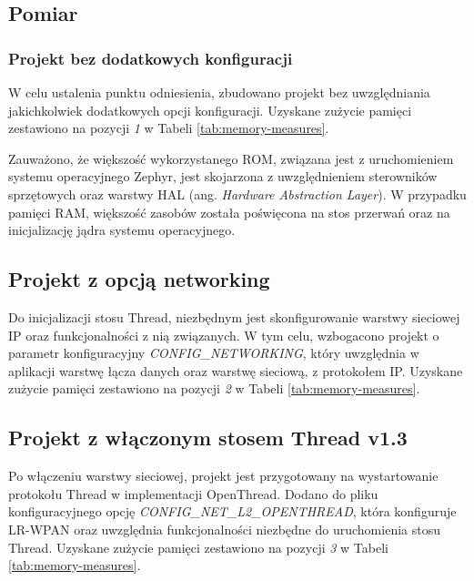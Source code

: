     \subsection{Pomiar}
    \label{subsec:mem-footprint-measure}

        \subsubsection{Projekt bez dodatkowych konfiguracji}
        
        W celu ustalenia punktu odniesienia, zbudowano projekt bez uwzględniania jakichkolwiek dodatkowych opcji konfiguracji.
        Uzyskane zużycie pamięci zestawiono na pozycji \textit{1} w Tabeli \ref{tab:memory-measures}.
        
        Zauważono, że większość wykorzystanego ROM, związana jest z uruchomieniem systemu operacyjnego Zephyr, jest skojarzona z uwzględnieniem sterowników sprzętowych oraz warstwy HAL (ang. \textit{Hardware Abstraction Layer}). W przypadku pamięci RAM, większość zasobów została poświęcona na stos przerwań oraz na inicjalizację jądra systemu operacyjnego.

        \subsection{Projekt z opcją networking}

        Do inicjalizacji stosu Thread, niezbędnym jest skonfigurowanie warstwy sieciowej IP oraz funkcjonalności z nią związanych. W tym celu, wzbogacono projekt o parametr konfiguracyjny \textit{CONFIG\_NETWORKING}, który uwzględnia w aplikacji warstwę łącza danych oraz warstwę sieciową, z protokołem IP.
        Uzyskane zużycie pamięci zestawiono na pozycji \textit{2} w Tabeli \ref{tab:memory-measures}.

        \subsection{Projekt z włączonym stosem Thread v1.3}

        Po włączeniu warstwy sieciowej, projekt jest przygotowany na wystartowanie protokołu Thread w implementacji OpenThread. Dodano do pliku konfiguracyjnego opcję \textit{CONFIG\_NET\_L2\_OPENTHREAD}, która konfiguruje LR-WPAN oraz uwzględnia funkcjonalności niezbędne do uruchomienia stosu Thread. Uzyskane zużycie pamięci zestawiono na pozycji \textit{3} w Tabeli \ref{tab:memory-measures}.


